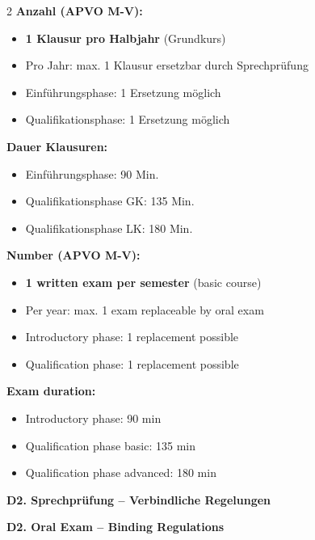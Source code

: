 \documentclass[10pt,a4paper]{article}
\newcommand{\secbil}[2]{%
\vspace{6pt}
\noindent\colorbox{spaet}{\parbox{0.48\textwidth}{\color{white}\bfseries\small #1}}%
\hfill%
\colorbox{english}{\parbox{0.48\textwidth}{\color{white}\bfseries\small #2}}
\vspace{3pt}
}
\begin{document}
\begin{paracol}{2}
\small
\textbf{Anzahl (APVO M-V):}
\begin{itemize}[noitemsep,topsep=2pt]
\item \textbf{1 Klausur pro Halbjahr} (Grundkurs)
\item Pro Jahr: max. 1 Klausur ersetzbar durch Sprechprüfung
\item Einführungsphase: 1 Ersetzung möglich
\item Qualifikationsphase: 1 Ersetzung möglich
\end{itemize}

\textbf{Dauer Klausuren:}
\begin{itemize}[noitemsep,topsep=2pt]
\item Einführungsphase: 90 Min.
\item Qualifikationsphase GK: 135 Min.
\item Qualifikationsphase LK: 180 Min.
\end{itemize}

\switchcolumn

\small\color{english}
\textbf{Number (APVO M-V):}
\begin{itemize}[noitemsep,topsep=2pt]
\item \textbf{1 written exam per semester} (basic course)
\item Per year: max. 1 exam replaceable by oral exam
\item Introductory phase: 1 replacement possible
\item Qualification phase: 1 replacement possible
\end{itemize}

\textbf{Exam duration:}
\begin{itemize}[noitemsep,topsep=2pt]
\item Introductory phase: 90 min
\item Qualification phase basic: 135 min
\item Qualification phase advanced: 180 min
\end{itemize}

\end{paracol}

\vspace{3mm}

\secbil{D2. Sprechprüfung -- Verbindliche Regelungen}{D2. Oral Exam -- Binding Regulations}

\vspace{2mm}
\end{document}
